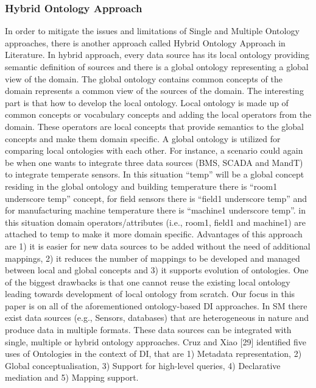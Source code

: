 \subsubsection{Hybrid Ontology Approach}
In order to mitigate the issues and limitations of Single and Multiple Ontology
approaches, there is another approach called Hybrid Ontology Approach in Literature. In hybrid approach, every data source has its local ontology providing semantic definition of sources and there is a global ontology representing a global view of the domain. 
The global ontology contains common concepts of the domain represents a common view of the sources of the domain. 
The interesting part is that how to develop the local ontology. 
Local ontology is made up of common concepts or vocabulary concepts and adding
the local operators from the domain. 
These operators are local concepts that provide semantics to the global concepts and make them domain specific. 
A global ontology is utilized for comparing local ontologies with each other. 
For instance, a scenario could again be when one wants to integrate three data
sources (BMS, SCADA and MandT) to integrate temperate sensors. In this situation
“temp” will be a global concept residing in the global ontology and building
temperature there is “room1 underscore temp” concept, for field sensors there is
“field1 underscore temp” and for manufacturing machine temperature there is
“machine1 underscore temp”. in this situation domain operators/attributes (i.e.,
room1, field1 and machine1) are attached to temp to make it more domain specific.  Advantages of this approach are 1) it is easier for new data sources to be added without the need of additional mappings, 2) it reduces the number of mappings to be developed and managed between local and global concepts and 3) it supports evolution of ontologies. One of the biggest drawbacks is that one cannot reuse the existing local ontology leading towards development of local ontology from scratch.
Our focus in this paper is on all of the aforementioned ontology-based DI
approaches. In SM there exist data sources (e.g., Sensors, databases) that are heterogeneous in nature and produce data in multiple formats. These data sources can be integrated with single, multiple or hybrid ontology approaches. Cruz and Xiao [29] identified five uses of Ontologies in the context of DI, that are 1) Metadata representation, 2) Global conceptualisation, 3) Support for high-level queries, 4) Declarative mediation and 5) Mapping support.

